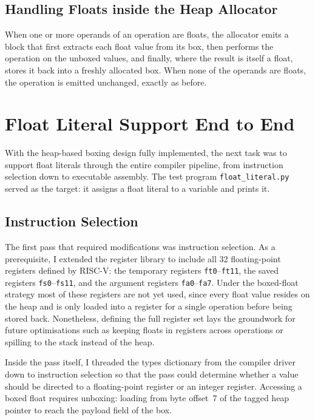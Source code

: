 \subsection{Handling Floats inside the Heap Allocator}

When one or more operands of an operation are floats, the allocator emits a block that first extracts each float value from its box, then performs the operation on the unboxed values, and finally, where the result is itself a float, stores it back into a freshly allocated box. When none of the operands are floats, the operation is emitted unchanged, exactly as before.


\section{Float Literal Support End to End}

With the heap-based boxing design fully implemented, the next task was to support float literals through the entire compiler pipeline, from instruction selection down to executable assembly. The test program \texttt{float\_literal.py} served as the target: it assigns a float literal to a variable and prints it.

\subsection{Instruction Selection}

The first pass that required modifications was instruction selection. As a prerequisite, I extended the register library to include all 32 floating-point registers defined by RISC-V: the temporary registers \texttt{ft0}--\texttt{ft11}, the saved registers \texttt{fs0}--\texttt{fs11}, and the argument registers \texttt{fa0}--\texttt{fa7}. Under the boxed-float strategy most of these registers are not yet used, since every float value resides on the heap and is only loaded into a register for a single operation before being stored back. Nonetheless, defining the full register set lays the groundwork for future optimisations such as keeping floats in registers across operations or spilling to the stack instead of the heap.

Inside the pass itself, I threaded the types dictionary from the compiler driver down to instruction selection so that the pass could determine whether a value should be directed to a floating-point register or an integer register. Accessing a boxed float requires unboxing: loading from byte offset~7 of the tagged heap pointer to reach the payload field of the box.

